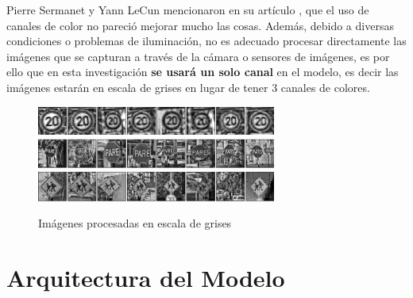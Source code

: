 		Pierre Sermanet y Yann LeCun mencionaron en su artículo \citep{LeCun}, que el uso de canales de color no pareció mejorar mucho las cosas. Además, debido a diversas condiciones o problemas de iluminación, no es adecuado procesar directamente las imágenes que se capturan a través de la cámara o sensores de imágenes, es por ello que en esta investigación {\bf se usará un solo canal} en el modelo, es decir las imágenes estarán en escala de grises en lugar de tener 3 canales de colores.
		
			\begin{figure}[H]
			\begin{center}
			\includegraphics[width=0.7\textwidth]{images/desarrollo/Normalization_Processing/proc_test1}
			\includegraphics[width=0.7\textwidth]{images/desarrollo/Normalization_Processing/proc_test3}
			\includegraphics[width=0.7\textwidth]{images/desarrollo/Normalization_Processing/proc_test4}
			\end{center}
			\begin{center}
			\caption{\small{Imágenes procesadas en escala de grises}}
			
			{\small{\fontsize{10}{16.8}\selectfont {Fuente: Elaboración propia}}}
			\end{center}
			\vspace{-1.5em}
			\end{figure}
			\newpage
	

\section{Arquitectura del Modelo}



